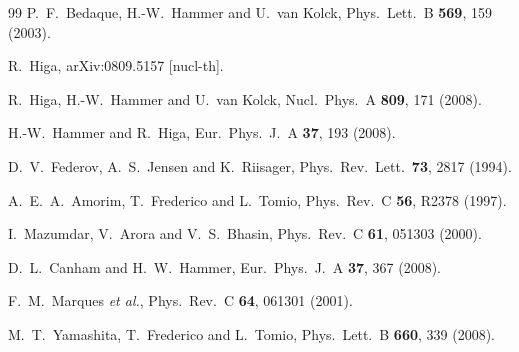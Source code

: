 \documentclass[aps,rmp,nofootinbib,twocolumn,floatfix]{revtex4}
\begin{document}
\begin{thebibliography}{99}
  P.~F.~Bedaque, H.-W.~Hammer and U.~van Kolck,
  Phys.\ Lett.\  B {\bf 569}, 159 (2003).


  R.~Higa,
  arXiv:0809.5157 [nucl-th].

  R.~Higa, H.-W.~Hammer and U.~van Kolck,
  Nucl.\ Phys.\  A {\bf 809}, 171 (2008).

  H.-W.~Hammer and R.~Higa,
Eur.\ Phys.\ J.\  A {\bf 37}, 193 (2008).


  D.~V.~Federov, A.~S.~Jensen and K.~Riisager,
  Phys.\ Rev.\ Lett.\  {\bf 73}, 2817 (1994).


  A.~E.~A.~Amorim, T.~Frederico and L.~Tomio,
  Phys.\ Rev.\  C {\bf 56}, R2378 (1997).

  I.~Mazumdar, V.~Arora and V.~S.~Bhasin,
  Phys.\ Rev.\  C {\bf 61}, 051303 (2000).

  D.~L.~Canham and H.~W.~Hammer,
Eur.\ Phys.\ J.\  A {\bf 37}, 367 (2008).

  F.~M.~Marques {\it et al.},
  Phys.\ Rev.\  C {\bf 64}, 061301 (2001).

  M.~T.~Yamashita, T.~Frederico and L.~Tomio,
  Phys.\ Lett.\ B {\bf 660}, 339 (2008).



\end{thebibliography}
\end{document}
